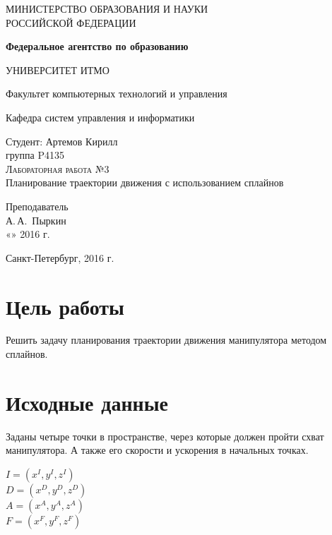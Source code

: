 \documentclass[a4paper,14pt]{extreport}
\begin{document}
	
\begin{titlepage}
	\begin{center}
		\large
		МИНИСТЕРСТВО ОБРАЗОВАНИЯ И НАУКИ\\ РОССИЙСКОЙ ФЕДЕРАЦИИ
		
		\textbf{Федеральное агентство по образованию}
		\vspace{0.5cm}
		
		УНИВЕРСИТЕТ ИТМО
		\vspace{0.25cm}
		
		Факультет компьютерных технологий и управления
		
		Кафедра систем управления и информатики
		\vfill
		
		
		Студент: Артемов Кирилл\\
		группа P4135\\
		
		\textsc{Лабораторная работа №3}\\[5mm]
		
		{\LARGE Планирование траектории движения с использованием сплайнов}
		\bigskip
		
	\end{center}
	\vfill
	
	\newlength{\ML}
	\hfill\begin{minipage}{0.4\textwidth}
		Преподаватель\\
		\underline{\hspace{\ML}} А.\,А.~Пыркин\\
		«\underline{\hspace{0.7cm}}» \underline{\hspace{2cm}} 2016 г.
	\end{minipage}%
	\bigskip
	
	\vfill
	
	\begin{center}
		Санкт-Петербург, 2016 г.
	\end{center}
\end{titlepage}

\section{Цель работы}
Решить задачу планирования траектории движения манипулятора методом сплайнов.

\section{Исходные данные}
	Заданы четыре точки в пространстве, через которые должен пройти схват манипулятора. А также его скорости и ускорения в начальных точках. 
	\begin{center}
		$I = (x^I, y^I, z^I)$\\
		$D = (x^D, y^D, z^D)$\\
		$A = (x^A, y^A, z^A)$\\
		$F = (x^F, y^F, z^F)$\\
	\end{center}
\end{document}
